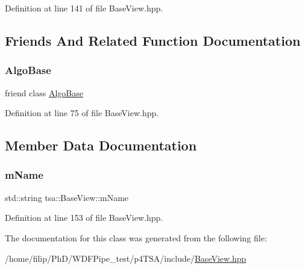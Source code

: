 Definition at line 141 of file Base\+View.\+hpp.



\subsection{Friends And Related Function Documentation}
\mbox{\label{classtsa_1_1_base_view_af7b68757603d571922c4e3cce401ec9f}} 
\subsubsection{\texorpdfstring{Algo\+Base}{AlgoBase}}
{\footnotesize\ttfamily friend class \hyperlink{classtsa_1_1_algo_base}{Algo\+Base}\hspace{0.3cm}{\ttfamily [friend]}}



Definition at line 75 of file Base\+View.\+hpp.



\subsection{Member Data Documentation}
\mbox{\label{classtsa_1_1_base_view_a91429dee1249c140160bfca20e783019}} 
\subsubsection{\texorpdfstring{m\+Name}{mName}}
{\footnotesize\ttfamily std\+::string tsa\+::\+Base\+View\+::m\+Name\hspace{0.3cm}{\ttfamily [protected]}}



Definition at line 153 of file Base\+View.\+hpp.



The documentation for this class was generated from the following file\+:\begin{DoxyCompactItemize}
\item 
/home/filip/\+Ph\+D/\+W\+D\+F\+Pipe\+\_\+test/p4\+T\+S\+A/include/\hyperlink{_base_view_8hpp}{Base\+View.\+hpp}\end{DoxyCompactItemize}

